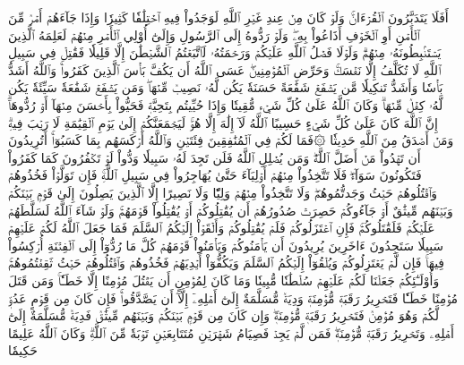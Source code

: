 أَفَلَا يَتَدَبَّرُونَ ٱلۡقُرۡءَانَۚ وَلَوۡ كَانَ مِنۡ عِندِ غَيۡرِ ٱللَّهِ لَوَجَدُواْ فِيهِ ٱخۡتِلَٰفٗا كَثِيرٗا
وَإِذَا جَآءَهُمۡ أَمۡرٞ مِّنَ ٱلۡأَمۡنِ أَوِ ٱلۡخَوۡفِ أَذَاعُواْ بِهِۦۖ وَلَوۡ رَدُّوهُ إِلَى ٱلرَّسُولِ وَإِلَىٰٓ أُوْلِي ٱلۡأَمۡرِ مِنۡهُمۡ لَعَلِمَهُ ٱلَّذِينَ يَسۡتَنۢبِطُونَهُۥ مِنۡهُمۡۗ وَلَوۡلَا فَضۡلُ ٱللَّهِ عَلَيۡكُمۡ وَرَحۡمَتُهُۥ لَٱتَّبَعۡتُمُ ٱلشَّيۡطَٰنَ إِلَّا قَلِيلٗا
فَقَٰتِلۡ فِي سَبِيلِ ٱللَّهِ لَا تُكَلَّفُ إِلَّا نَفۡسَكَۚ وَحَرِّضِ ٱلۡمُؤۡمِنِينَۖ عَسَى ٱللَّهُ أَن يَكُفَّ بَأۡسَ ٱلَّذِينَ كَفَرُواْۚ وَٱللَّهُ أَشَدُّ بَأۡسٗا وَأَشَدُّ تَنكِيلٗا
مَّن يَشۡفَعۡ شَفَٰعَةً حَسَنَةٗ يَكُن لَّهُۥ نَصِيبٞ مِّنۡهَاۖ وَمَن يَشۡفَعۡ شَفَٰعَةٗ سَيِّئَةٗ يَكُن لَّهُۥ كِفۡلٞ مِّنۡهَاۗ وَكَانَ ٱللَّهُ عَلَىٰ كُلِّ شَيۡءٖ مُّقِيتٗا
وَإِذَا حُيِّيتُم بِتَحِيَّةٖ فَحَيُّواْ بِأَحۡسَنَ مِنۡهَآ أَوۡ رُدُّوهَآۗ إِنَّ ٱللَّهَ كَانَ عَلَىٰ كُلِّ شَيۡءٍ حَسِيبًا
ٱللَّهُ لَآ إِلَٰهَ إِلَّا هُوَۚ لَيَجۡمَعَنَّكُمۡ إِلَىٰ يَوۡمِ ٱلۡقِيَٰمَةِ لَا رَيۡبَ فِيهِۗ وَمَنۡ أَصۡدَقُ مِنَ ٱللَّهِ حَدِيثٗا
۞فَمَا لَكُمۡ فِي ٱلۡمُنَٰفِقِينَ فِئَتَيۡنِ وَٱللَّهُ أَرۡكَسَهُم بِمَا كَسَبُوٓاْۚ أَتُرِيدُونَ أَن تَهۡدُواْ مَنۡ أَضَلَّ ٱللَّهُۖ وَمَن يُضۡلِلِ ٱللَّهُ فَلَن تَجِدَ لَهُۥ سَبِيلٗا
وَدُّواْ لَوۡ تَكۡفُرُونَ كَمَا كَفَرُواْ فَتَكُونُونَ سَوَآءٗۖ فَلَا تَتَّخِذُواْ مِنۡهُمۡ أَوۡلِيَآءَ حَتَّىٰ يُهَاجِرُواْ فِي سَبِيلِ ٱللَّهِۚ فَإِن تَوَلَّوۡاْ فَخُذُوهُمۡ وَٱقۡتُلُوهُمۡ حَيۡثُ وَجَدتُّمُوهُمۡۖ وَلَا تَتَّخِذُواْ مِنۡهُمۡ وَلِيّٗا وَلَا نَصِيرًا
إِلَّا ٱلَّذِينَ يَصِلُونَ إِلَىٰ قَوۡمِۭ بَيۡنَكُمۡ وَبَيۡنَهُم مِّيثَٰقٌ أَوۡ جَآءُوكُمۡ حَصِرَتۡ صُدُورُهُمۡ أَن يُقَٰتِلُوكُمۡ أَوۡ يُقَٰتِلُواْ قَوۡمَهُمۡۚ وَلَوۡ شَآءَ ٱللَّهُ لَسَلَّطَهُمۡ عَلَيۡكُمۡ فَلَقَٰتَلُوكُمۡۚ فَإِنِ ٱعۡتَزَلُوكُمۡ فَلَمۡ يُقَٰتِلُوكُمۡ وَأَلۡقَوۡاْ إِلَيۡكُمُ ٱلسَّلَمَ فَمَا جَعَلَ ٱللَّهُ لَكُمۡ عَلَيۡهِمۡ سَبِيلٗا
سَتَجِدُونَ ءَاخَرِينَ يُرِيدُونَ أَن يَأۡمَنُوكُمۡ وَيَأۡمَنُواْ قَوۡمَهُمۡ كُلَّ مَا رُدُّوٓاْ إِلَى ٱلۡفِتۡنَةِ أُرۡكِسُواْ فِيهَاۚ فَإِن لَّمۡ يَعۡتَزِلُوكُمۡ وَيُلۡقُوٓاْ إِلَيۡكُمُ ٱلسَّلَمَ وَيَكُفُّوٓاْ أَيۡدِيَهُمۡ فَخُذُوهُمۡ وَٱقۡتُلُوهُمۡ حَيۡثُ ثَقِفۡتُمُوهُمۡۚ وَأُوْلَـٰٓئِكُمۡ جَعَلۡنَا لَكُمۡ عَلَيۡهِمۡ سُلۡطَٰنٗا مُّبِينٗا
وَمَا كَانَ لِمُؤۡمِنٍ أَن يَقۡتُلَ مُؤۡمِنًا إِلَّا خَطَـٔٗاۚ وَمَن قَتَلَ مُؤۡمِنًا خَطَـٔٗا فَتَحۡرِيرُ رَقَبَةٖ مُّؤۡمِنَةٖ وَدِيَةٞ مُّسَلَّمَةٌ إِلَىٰٓ أَهۡلِهِۦٓ إِلَّآ أَن يَصَّدَّقُواْۚ فَإِن كَانَ مِن قَوۡمٍ عَدُوّٖ لَّكُمۡ وَهُوَ مُؤۡمِنٞ فَتَحۡرِيرُ رَقَبَةٖ مُّؤۡمِنَةٖۖ وَإِن كَانَ مِن قَوۡمِۭ بَيۡنَكُمۡ وَبَيۡنَهُم مِّيثَٰقٞ فَدِيَةٞ مُّسَلَّمَةٌ إِلَىٰٓ أَهۡلِهِۦ وَتَحۡرِيرُ رَقَبَةٖ مُّؤۡمِنَةٖۖ فَمَن لَّمۡ يَجِدۡ فَصِيَامُ شَهۡرَيۡنِ مُتَتَابِعَيۡنِ تَوۡبَةٗ مِّنَ ٱللَّهِۗ وَكَانَ ٱللَّهُ عَلِيمًا حَكِيمٗا
